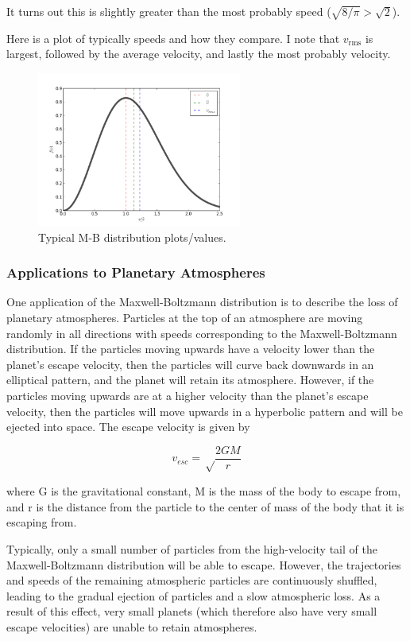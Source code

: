 \documentclass{article}
\begin{document}
It turns out this is slightly greater than the most probably speed ($\sqrt{8/\pi} > \sqrt{2}$).

Here is a plot of typically speeds and how they compare. I note that $v_\text{rms}$ is largest, followed by the average velocity, and lastly the most probably velocity. 

\begin{figure}[ht]
    \centering
    \includegraphics[width=0.6\textwidth]{mbdist.png}
    \caption{Typical M-B distribution plots/values.}
    \label{fig:mwdist}
\end{figure}

\subsubsection{Applications to Planetary Atmospheres}
One application of the Maxwell-Boltzmann distribution is to describe the loss of planetary atmospheres. Particles at the top of an atmosphere are moving randomly in all directions with speeds corresponding to the Maxwell-Boltzmann distribution. If the particles moving upwards have a velocity lower than the planet's escape velocity, then the particles will curve back downwards in an elliptical pattern, and the planet will retain its atmosphere. However, if the particles moving upwards are at a higher velocity than the planet's escape velocity, then the particles will move upwards in a hyperbolic pattern and will be ejected into space. The escape velocity is given by

$$ v_{esc} = \sqrt\frac{2GM}{r} $$

where G is the gravitational constant, M is the mass of the body to escape from, and r is the distance from the particle to the center of mass of the body that it is escaping from.

Typically, only a small number of particles from the high-velocity tail of the Maxwell-Boltzmann distribution will be able to escape. However, the trajectories and speeds of the remaining atmospheric particles are continuously shuffled, leading to the gradual ejection of particles and a slow atmospheric loss. As a result of this effect, very small planets (which therefore also have very small escape velocities) are unable to retain atmospheres.
\end{document}
